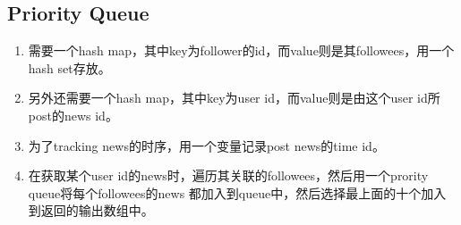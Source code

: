 \subsection{Priority Queue}
\begin{enumerate}
\item 需要一个hash map，其中key为follower的id，而value则是其followees，用一个hash set存放。
\item 另外还需要一个hash map，其中key为user id，而value则是由这个user id所post的news id。
\item 为了tracking news的时序，用一个变量记录post news的time id。
\item 在获取某个user id的news时，遍历其关联的followees，然后用一个prority queue将每个followees的news 都加入到queue中，然后选择最上面的十个加入到返回的输出数组中。
\end{enumerate}

